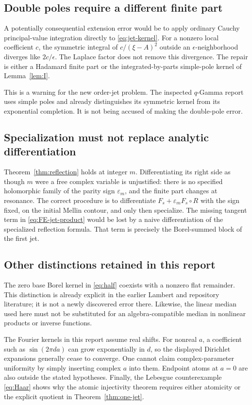\documentclass[11pt,a4paper]{article}
\numberwithin{equation}{section}
\theoremstyle{definition}\newtheorem{definition}[theorem]{Definition}
\theoremstyle{remark}\newtheorem{remark}[theorem]{Remark}
\newcommand{\eps}{\varepsilon}\newcommand{\muh}{\widehat\mu}
\begin{document}
\subsection{Double poles require a different finite part}
A potentially consequential extension error would be to apply ordinary
Cauchy principal-value integration directly to
\eqref{eq:jet-kernel}. For a nonzero local coefficient $c$, the symmetric
integral of $c/(\xi-A)^2$ outside an $\epsilon$-neighborhood diverges
like $2c/\epsilon$. The Laplace factor does not remove this divergence.
The repair is either a Hadamard finite part or the integrated-by-parts
simple-pole kernel of Lemma~\ref{lem:I}.

This is a warning for the new order-jet problem. The inspected
$q$-Gamma report \cite{repoq} uses simple poles and already distinguishes
its symmetric kernel from its exponential completion. It is not being
accused of making the double-pole error.

\subsection{Specialization must not replace analytic differentiation}
Theorem~\ref{thm:reflection} holds at integer $m$. Differentiating its
right side as though $m$ were a free complex variable is unjustified:
there is no specified holomorphic family of the parity sign
$\eps_m$, and the finite part changes at resonance. The correct
procedure is to differentiate $F_s+\eps_mF_s\circ R$ with the sign
fixed, on the initial Mellin contour, and only then specialize.
The missing tangent term in \eqref{eq:FE-jet-product} would be lost by
a naive differentiation of the specialized reflection formula.
That term is precisely the Borel-summed block of the first jet.

\subsection{Other distinctions retained in this report}
The zero base Borel kernel in \eqref{eq:half} coexists with a nonzero
flat remainder. This distinction is already explicit in the earlier
Lambert and repository literature; it is not a newly discovered error
there. Likewise, the linear median used here must not be substituted
for an algebra-compatible median in nonlinear products or inverse
functions.

The Fourier kernels in this report assume real shifts. For nonreal
$a$, a coefficient such as $\sin(2\pi da)$ can grow exponentially in
$d$, so the displayed Dirichlet expansions generally cease to converge.
One cannot claim complex-parameter uniformity by simply inserting
complex $a$ into them. Endpoint atoms at $a=0$ are also outside the
stated hypotheses. Finally, the Lebesgue counterexample
\eqref{eq:Haar} shows why the atomic injectivity theorem requires either
atomicity or the explicit quotient in Theorem~\ref{thm:one-jet}.
\end{document}
